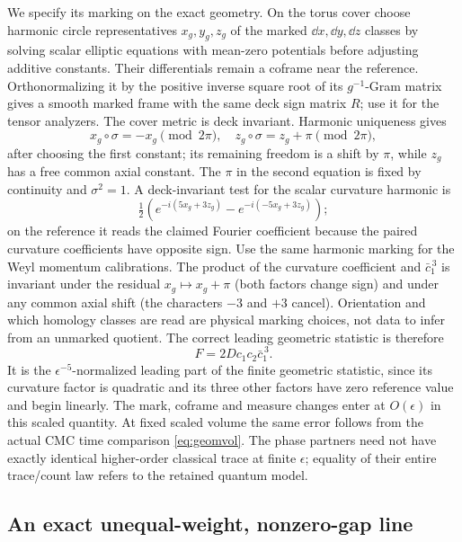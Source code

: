 We specify its marking on the exact geometry. On the torus cover choose harmonic circle representatives \(x_g,y_g,z_g\) of the marked \(\dd x,\dd y,\dd z\) classes by solving scalar elliptic equations with mean-zero potentials before adjusting additive constants. Their differentials remain a coframe near the reference. Orthonormalizing it by the positive inverse square root of its \(g^{-1}\)-Gram matrix gives a smooth marked frame with the same deck sign matrix \(R\); use it for the tensor analyzers. The cover metric is deck invariant. Harmonic uniqueness gives
\[
        x_g\circ\sigma=-x_g \pmod {2\pi},\quad
        z_g\circ\sigma=z_g+\pi \pmod {2\pi},
\]
after choosing the first constant; its remaining freedom is a shift by \(\pi\), while \(z_g\) has a free common axial constant. The \(\pi\) in the second equation is fixed by continuity and \(\sigma^2=1\). A deck-invariant test for the scalar curvature harmonic is
\[
 \tfrac12\!\left(e^{-i(5x_g+3z_g)}-e^{-i(-5x_g+3z_g)}\right);
\]
on the reference it reads the claimed Fourier coefficient because the paired curvature coefficients have opposite sign. Use the same harmonic marking for the Weyl momentum calibrations. The product of the curvature coefficient and \(\bar c_1^{\,3}\) is invariant under the residual \(x_g\mapsto x_g+\pi\) (both factors change sign) and under any common axial shift (the characters \(-3\) and \(+3\) cancel). Orientation and which homology classes are read are physical marking choices, not data to infer from an unmarked quotient. The correct leading geometric statistic is therefore
\begin{equation}\label{eq:F}
         F=2D c_1c_2\bar c_1^{\,3}.
\end{equation}
It is the \(\epsilon^{-5}\)-normalized leading part of the finite geometric statistic, since its curvature factor is quadratic and its three other factors have zero reference value and begin linearly. The mark, coframe and measure changes enter at \(O(\epsilon)\) in this scaled quantity. At fixed scaled volume the same error follows from the actual CMC time comparison \eqref{eq:geomvol}. The phase partners need not have exactly identical higher-order classical trace at finite \(\epsilon\); equality of their entire trace/count law refers to the retained quantum model.

\subsection{An exact unequal-weight, nonzero-gap line}

